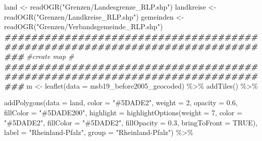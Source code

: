 \documentclass[
]{article}
\newenvironment{Shaded}{\begin{snugshade}}{\end{snugshade}}
\newcommand{\AttributeTok}[1]{\textcolor[rgb]{0.77,0.63,0.00}{#1}}
\newcommand{\CommentTok}[1]{\textcolor[rgb]{0.56,0.35,0.01}{\textit{#1}}}
\newcommand{\ConstantTok}[1]{\textcolor[rgb]{0.00,0.00,0.00}{#1}}
\newcommand{\DecValTok}[1]{\textcolor[rgb]{0.00,0.00,0.81}{#1}}
\newcommand{\DocumentationTok}[1]{\textcolor[rgb]{0.56,0.35,0.01}{\textbf{\textit{#1}}}}
\newcommand{\FloatTok}[1]{\textcolor[rgb]{0.00,0.00,0.81}{#1}}
\newcommand{\FunctionTok}[1]{\textcolor[rgb]{0.00,0.00,0.00}{#1}}
\newcommand{\NormalTok}[1]{#1}
\newcommand{\OtherTok}[1]{\textcolor[rgb]{0.56,0.35,0.01}{#1}}
\newcommand{\SpecialCharTok}[1]{\textcolor[rgb]{0.00,0.00,0.00}{#1}}
\newcommand{\StringTok}[1]{\textcolor[rgb]{0.31,0.60,0.02}{#1}}
\begin{document}
\begin{Shaded}
\begin{Highlighting}[]
\NormalTok{land }\OtherTok{\textless{}{-}} \FunctionTok{readOGR}\NormalTok{(}\StringTok{"Grenzen/Landesgrenze\_RLP.shp"}\NormalTok{)}
\NormalTok{landkreise }\OtherTok{\textless{}{-}} \FunctionTok{readOGR}\NormalTok{(}\StringTok{"Grenzen/Landkreise\_RLP.shp"}\NormalTok{)}
\NormalTok{gemeinden }\OtherTok{\textless{}{-}} \FunctionTok{readOGR}\NormalTok{(}\StringTok{"Grenzen/Verbandsgemeinde\_RLP.shp"}\NormalTok{)}
\DocumentationTok{\#\#\#\#\#\#\#\#\#\#\#\#\#\#\#\#\#\#\#\#\#\#\#\#\#\#\#\#\#\#\#\#\#\#\#\#\#\#\#\#\#\#\#\#\#\#\#\#\#\#\#\#\#\#\#\#\#\#\#\#\#\#\#\#\#\#\#\#\#\#\#\#\#\#\#\#\#\#\#}
\CommentTok{\#create map                                                                   \#}
\DocumentationTok{\#\#\#\#\#\#\#\#\#\#\#\#\#\#\#\#\#\#\#\#\#\#\#\#\#\#\#\#\#\#\#\#\#\#\#\#\#\#\#\#\#\#\#\#\#\#\#\#\#\#\#\#\#\#\#\#\#\#\#\#\#\#\#\#\#\#\#\#\#\#\#\#\#\#\#\#\#\#\#}
\NormalTok{m }\OtherTok{\textless{}{-}} \FunctionTok{leaflet}\NormalTok{(}\AttributeTok{data =}\NormalTok{ msb19\_before2005\_geocoded) }\SpecialCharTok{\%\textgreater{}\%}
  \FunctionTok{addTiles}\NormalTok{() }\SpecialCharTok{\%\textgreater{}\%}
  
  \FunctionTok{addPolygons}\NormalTok{(}\AttributeTok{data =}\NormalTok{ land,}
              \AttributeTok{color =} \StringTok{"\#5DADE2"}\NormalTok{,}
              \AttributeTok{weight =} \DecValTok{2}\NormalTok{,}
              \AttributeTok{opacity =} \FloatTok{0.6}\NormalTok{,}
              \AttributeTok{fillColor =} \StringTok{"\#5DADE200"}\NormalTok{,}
              \AttributeTok{highlight =} \FunctionTok{highlightOptions}\NormalTok{(}\AttributeTok{weight =} \DecValTok{7}\NormalTok{,}
                                           \AttributeTok{color =} \StringTok{"\#5DADE2"}\NormalTok{,}
                                           \AttributeTok{fillColor =} \StringTok{"\#5DADE2"}\NormalTok{,}
                                           \AttributeTok{fillOpacity =} \FloatTok{0.3}\NormalTok{,}
                                           \AttributeTok{bringToFront =} \ConstantTok{TRUE}\NormalTok{),}
              \AttributeTok{label =} \StringTok{"Rheinland{-}Pfalz"}\NormalTok{,}
              \AttributeTok{group =} \StringTok{"Rheinland{-}Pfalz"}\NormalTok{) }\SpecialCharTok{\%\textgreater{}\%} 
  

\end{Highlighting}
\end{Shaded}
\end{document}
